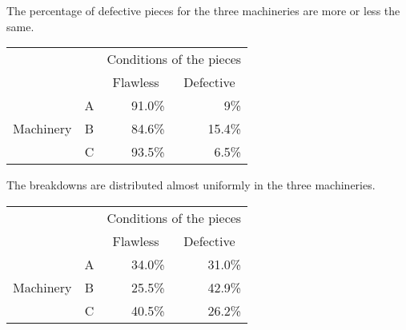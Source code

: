 \begin{frame}
  \begin{footnotesize}
    The percentage of defective pieces for the three machineries are more or less the same.\\
  \end{footnotesize}
  \begin{table}
    \begin{tabular}{|c|c|r|r|}
      \cline{3-4}
      \multicolumn{2}{c}{} & \multicolumn{2}{|c|}{Conditions of the pieces}\\ \cline{3-4}
      \multicolumn{2}{c}{} & \multicolumn{1}{|c|}{\hspace*{.25cm}Flawless\hspace*{.25cm}} & \multicolumn{1}{|c|}{Defective}\\ \hline
      & \multicolumn{1}{|c|}{\hspace*{.5cm}A\hspace*{.5cm}} & \multicolumn{1}{|r|}{91.0\%} & \multicolumn{1}{|r|}{9\%}\\ \cline{2-4}
      \multicolumn{1}{|c|}{Machinery } & \multicolumn{1}{|c|}{B} & \multicolumn{1}{|r|}{84.6\%} & \multicolumn{1}{|r|}{15.4\%}\\ \cline{2-4}
      & \multicolumn{1}{|c|}{C} & \multicolumn{1}{|r|}{93.5\%} & \multicolumn{1}{|r|}{6.5\%}\\ \hline
    \end{tabular}
  \end{table} 
  \vspace*{.5cm}
  \begin{footnotesize}
    The breakdowns are distributed almost uniformly in the three machineries.
  \end{footnotesize}
  \begin{table}
    \begin{tabular}{|c|c|r|r|}
      \cline{3-4}
      \multicolumn{2}{c}{} & \multicolumn{2}{|c|}{Conditions of the pieces}\\ \cline{3-4}
      \multicolumn{2}{c}{} & \multicolumn{1}{|c|}{\hspace*{.25cm}Flawless\hspace*{.25cm}} & \multicolumn{1}{|c|}{Defective}\\ \hline
      & \multicolumn{1}{|c|}{\hspace*{.5cm}A\hspace*{.5cm}} & \multicolumn{1}{|r|}{34.0\%} & \multicolumn{1}{|r|}{31.0\%}\\ \cline{2-4}
      \multicolumn{1}{|c|}{Machinery} & \multicolumn{1}{|c|}{B} & \multicolumn{1}{|r|}{25.5\%} & \multicolumn{1}{|r|}{42.9\%}\\ \cline{2-4}
      & \multicolumn{1}{|c|}{C} & \multicolumn{1}{|r|}{40.5\%} & \multicolumn{1}{|r|}{26.2\%}\\ \hline
    \end{tabular}
  \end{table} 
  \vspace*{.5cm}
\end{frame}

